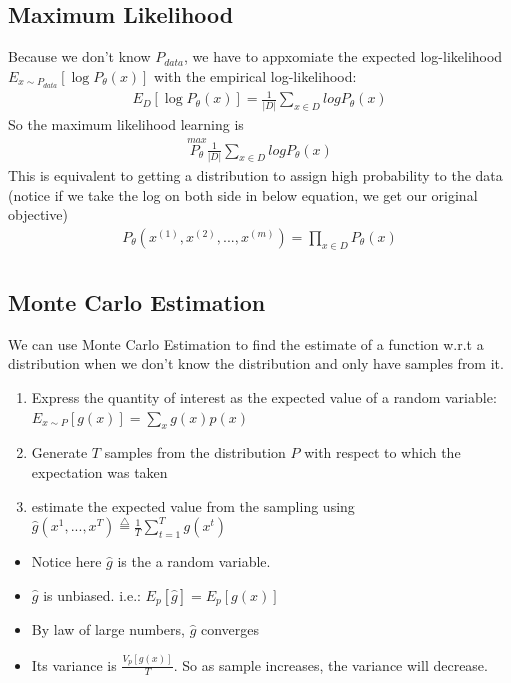 \subsection{Maximum Likelihood}
Because we don't know $P_{data}$, we have to appxomiate the expected log-likelihood $E_{x\sim P_{data}}[\log P_\theta(x)]$ with the empirical log-likelihood: 
    \begin{align*}
        E_{D}[\log P_\theta (x)] = \frac{1}{|D|}\sum_{x\in D} log P_\theta(x)
    \end{align*}
So the maximum likelihood learning is 
    \begin{align*}
        \overset{max}{P_\theta} \frac{1}{|D|}\sum_{x\in D} log P_\theta(x)
    \end{align*}
This is equivalent to getting a distribution to assign high probability to the data (notice if we take the log on both side in below equation, we get our original objective) 
    \begin{align*}
        P_\theta(x^{(1)}, x^{(2)}, ..., x^{(m)}) = \prod_{x\in D} P_\theta(x) \\
    \end{align*}
    

\subsection{Monte Carlo Estimation}
We can use Monte Carlo Estimation to find the estimate of a function w.r.t a distribution when we don't know the distribution and only have samples from it. 
    \begin{enumerate}
        \item Express the quantity of interest as the expected value of a random variable: $E_{x\sim P}[g(x)] = \sum_x g(x) p(x)$
        \item Generate $T$ samples from the distribution $P$ with respect to which the expectation was taken 
        \item estimate the expected value from the sampling using $\hat{g}(x^1, ..., x^T) \overset{\triangle}{=} \frac{1}{T} \sum_{t=1}^T g(x^t)$
    \end{enumerate}
    \begin{itemize}
        \item Notice here $\hat{g}$ is the a random variable. 
        \item $\hat{g}$ is unbiased. i.e.: $E_p[\hat{g}] = E_p[g(x)]$
        \item By law of large numbers, $\hat{g}$ converges 
        \item Its variance is $\frac{V_p[g(x)]}{T}$. So as sample increases, the variance will decrease. 
    \end{itemize}
    
